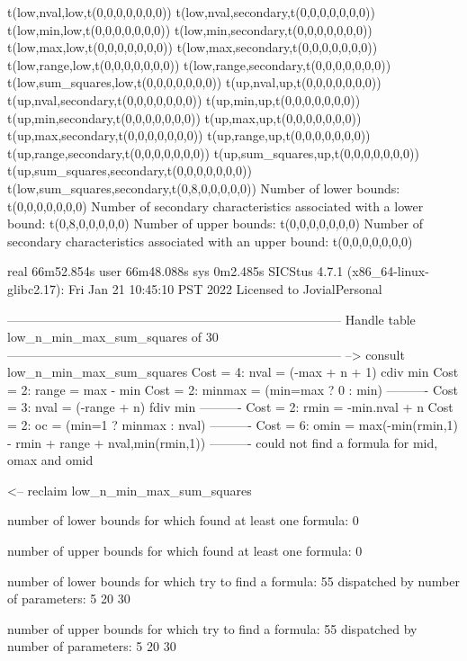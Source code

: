 t(low,nval,low,t(0,0,0,0,0,0,0))
t(low,nval,secondary,t(0,0,0,0,0,0,0))
t(low,min,low,t(0,0,0,0,0,0,0))
t(low,min,secondary,t(0,0,0,0,0,0,0))
t(low,max,low,t(0,0,0,0,0,0,0))
t(low,max,secondary,t(0,0,0,0,0,0,0))
t(low,range,low,t(0,0,0,0,0,0,0))
t(low,range,secondary,t(0,0,0,0,0,0,0))
t(low,sum_squares,low,t(0,0,0,0,0,0,0))
t(up,nval,up,t(0,0,0,0,0,0,0))
t(up,nval,secondary,t(0,0,0,0,0,0,0))
t(up,min,up,t(0,0,0,0,0,0,0))
t(up,min,secondary,t(0,0,0,0,0,0,0))
t(up,max,up,t(0,0,0,0,0,0,0))
t(up,max,secondary,t(0,0,0,0,0,0,0))
t(up,range,up,t(0,0,0,0,0,0,0))
t(up,range,secondary,t(0,0,0,0,0,0,0))
t(up,sum_squares,up,t(0,0,0,0,0,0,0))
t(up,sum_squares,secondary,t(0,0,0,0,0,0,0))
t(low,sum_squares,secondary,t(0,8,0,0,0,0,0))
Number of lower bounds:                                             t(0,0,0,0,0,0,0)
Number of secondary characteristics associated with a lower bound:  t(0,8,0,0,0,0,0)
Number of upper bounds:                                             t(0,0,0,0,0,0,0)
Number of secondary characteristics associated with an upper bound: t(0,0,0,0,0,0,0)

real	66m52.854s
user	66m48.088s
sys	0m2.485s
SICStus 4.7.1 (x86_64-linux-glibc2.17): Fri Jan 21 10:45:10 PST 2022
Licensed to JovialPersonal


--------------------------------------------------------------------------------
Handle table low_n_min_max_sum_squares of 30
--------------------------------------------------------------------------------
--> consult low_n_min_max_sum_squares
Cost =  4:  nval   = (-max + n + 1) cdiv min
Cost =  2:  range  = max - min
Cost =  2:  minmax = (min=max ? 0 : min)
----------
Cost =  3:  nval   = (-range + n) fdiv min
----------
Cost =  2:  rmin   = -min.nval + n
Cost =  2:  oc     = (min=1 ? minmax : nval)
----------
Cost =  6:  omin   = max(-min(rmin,1) - rmin + range + nval,min(rmin,1))
----------
could not find a formula for mid, omax and omid

<-- reclaim low_n_min_max_sum_squares

number of lower bounds for which found at least one formula: 0

number of upper bounds for which found at least one formula: 0

number of lower bounds for which try to find a formula: 55
dispatched by number of parameters: 5  20  30

number of upper bounds for which try to find a formula: 55
dispatched by number of parameters: 5  20  30

